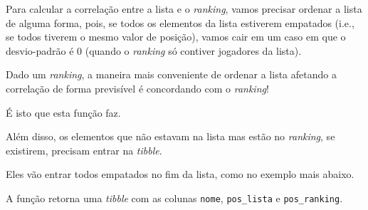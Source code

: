 \documentclass[
  letterpaper,
  DIV=11,
  numbers=noendperiod]{scrreprt}
\begin{document}
Para calcular a correlação entre a lista e o \emph{ranking}, vamos
precisar ordenar a lista de alguma forma, pois, se todos os elementos da
lista estiverem empatados (i.e., se todos tiverem o mesmo valor de
posição), vamos cair em um caso em que o desvio-padrão é $0$ (quando o
\emph{ranking} só contiver jogadores da lista).

Dado um \emph{ranking}, a maneira mais conveniente de ordenar a lista
afetando a correlação de forma previsível é concordando com o
\emph{ranking}!

É isto que esta função faz.

Além disso, os elementos que não estavam na lista mas estão no
\emph{ranking}, se existirem, precisam entrar na \emph{tibble}.

Eles vão entrar todos empatados no fim da lista, como no exemplo mais
abaixo.

A função retorna uma \emph{tibble} com as colunas \texttt{nome},
\texttt{pos\_lista} e \texttt{pos\_ranking}.
\end{document}

